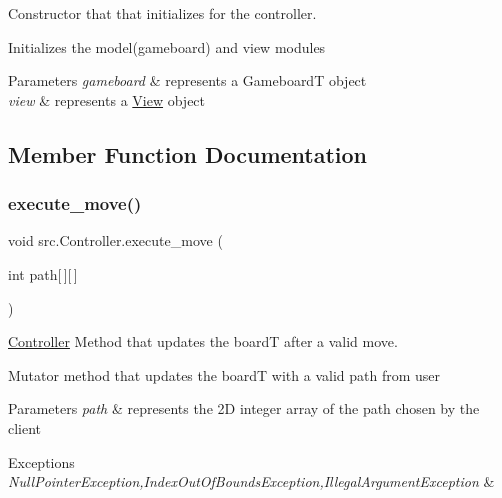 Constructor that that initializes for the controller. 

Initializes the model(gameboard) and view modules 
\begin{DoxyParams}{Parameters}
{\em gameboard} & represents a GameboardT object \\
\hline
{\em view} & represents a \hyperlink{classsrc_1_1View}{View} object \\
\hline
\end{DoxyParams}


\subsection{Member Function Documentation}
\mbox{\label{classsrc_1_1Controller_aa1d328484901f41258cac4205803eeb4}} 
\subsubsection{\texorpdfstring{execute\+\_\+move()}{execute\_move()}}
{\footnotesize\ttfamily void src.\+Controller.\+execute\+\_\+move (\begin{DoxyParamCaption}\item[{int}]{path\mbox{[}$\,$\mbox{]}\mbox{[}$\,$\mbox{]} }\end{DoxyParamCaption})}



\hyperlink{classsrc_1_1Controller}{Controller} Method that updates the boardT after a valid move. 

Mutator method that updates the boardT with a valid path from user 
\begin{DoxyParams}{Parameters}
{\em path} & represents the 2D integer array of the path chosen by the client \\
\hline
\end{DoxyParams}

\begin{DoxyExceptions}{Exceptions}
{\em Null\+Pointer\+Exception,Index\+Out\+Of\+Bounds\+Exception,Illegal\+Argument\+Exception} & \\
\hline
\end{DoxyExceptions}
\mbox{\label{classsrc_1_1Controller_ada325ebb1e30dea7f65ea1259a06ea22}} 
